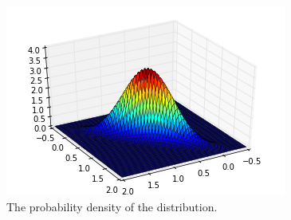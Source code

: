 \documentclass[a4paper,10pt]{article}
\numberwithin{equation}{section} %
\numberwithin{figure}{section} %
\numberwithin{table}{section} %
\theoremstyle{mytheor}
\begin{document}
\begin{enumerate}
		\begin{figure}[h!]
   			\centering
   			\includegraphics{probdens.png}\vspace{-0.2cm}
   			\caption{\vspace{-0.2cm} The probability density of the distribution.}
  		\end{figure}
\end{enumerate}
\end{document}
